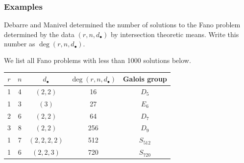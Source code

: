 \documentclass{beamer}
\theoremstyle{definition}
\newcommand{\new}[1]{{\color{black!10!blue}#1}}
\begin{document}
\begin{frame}
\frametitle{Examples}
Debarre and Manivel determined the number of solutions to the Fano problem determined by the data $(r,n,d_\bullet)$ by intersection theoretic means. Write this number as $\deg(r,n,d_\bullet)$.

We list all Fano problems with less than 1000 solutions below.

\begin{table}[htb]
  \label{Small Fano}
  \def\arraystretch{1.1}
  \begin{tabular}{||c|c|c|c|c||}
    \hline
    $r$ & $n$ & $d_\bullet$ & $\deg(r,n,d_\bullet)$ & Galois group\\
    \hline\hline
    1 & 4 & $(2,2)$ & 16 & $D_5$\\
    \hline
    1 & 3 & $(3)$ & 27 & $E_6$\\
    \hline
    2 & 6 & $(2,2)$ & 64 & $D_7$\\
    \hline
    3 & 8 & $(2,2)$ & 256 & $D_9$\\
    \hline
    1 & 7 & $(2,2,2,2)$ & 512 & \new{$S_{512}$}\\
    \hline
    1 & 6 & $(2,2,3)$ & 720  & \new{$S_{720}$}\\
    \hline
  \end{tabular}
\end{table}
\end{frame}
\end{document}

